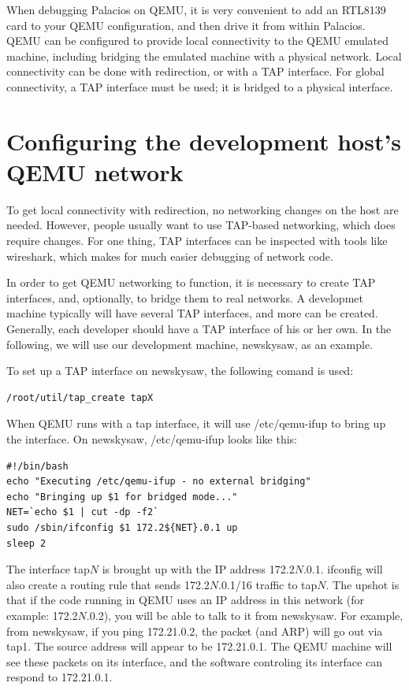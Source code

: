 \documentclass[11pt]{article}
\begin{document}
When debugging Palacios on QEMU, it is very convenient to add an
RTL8139 card to your QEMU configuration, and then drive it from within
Palacios.  QEMU can be configured to provide local connectivity to the
QEMU emulated machine, including bridging the emulated machine with a
physical network.  Local connectivity can be done with redirection, or
with a TAP interface.  For global connectivity, a TAP interface must
be used; it is bridged to a physical interface.

\section{Configuring the development host's QEMU network}

To get local connectivity with redirection, no networking changes on
the host are needed.  However, people usually want to use TAP-based
networking, which does require changes.  For one thing, TAP interfaces
can be inspected with tools like wireshark, which makes for much
easier debugging of network code.

In order to get QEMU networking to function, it is necessary to create
TAP interfaces, and, optionally, to bridge them to real networks.  A
developmet machine typically will have several TAP interfaces, and
more can be created.  Generally, each developer should have a TAP
interface of his or her own.  In the following, we will use our
development machine, newskysaw, as an example.

To set up a TAP interface on newskysaw, the following comand is used:
\begin{verbatim}
/root/util/tap_create tapX
\end{verbatim}

When QEMU runs with a tap interface, it will use /etc/qemu-ifup to
bring up the interface.  On newskysaw, /etc/qemu-ifup looks like this:

\begin{verbatim}
#!/bin/bash
echo "Executing /etc/qemu-ifup - no external bridging"
echo "Bringing up $1 for bridged mode..."
NET=`echo $1 | cut -dp -f2` 
sudo /sbin/ifconfig $1 172.2${NET}.0.1 up
sleep 2
\end{verbatim}

The interface tap$N$ is brought up with the IP address 172.2$N$.0.1.
ifconfig will also create a routing rule that sends 172.2$N$.0.1/16
traffic to tap$N$.  The upshot is that if the code running in QEMU
uses an IP address in this network (for example: 172.2$N$.0.2), you
will be able to talk to it from newskysaw.  For example, from
newskysaw, if you ping 172.21.0.2, the packet (and ARP) will go out via
tap1.  The source address will appear to be 172.21.0.1.  The QEMU
machine will see these packets on its interface, and the software
controling its interface can respond to 172.21.0.1.  
\end{document}
